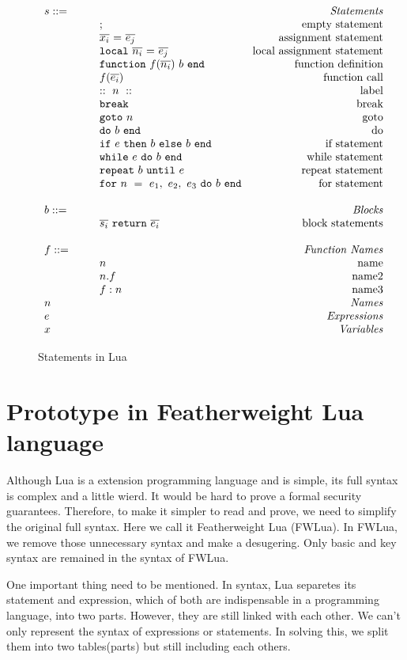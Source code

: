 \documentclass{article}
\begin{document}
\begin{figure}
\caption{Statements in Lua}
\label{fig:LuaStat}
\[
\begin{array}{llr}
  \mydefhead{s ::=\qquad\qquad\qquad\qquad}{Statements}
  \mydefcase{;}{empty statement}
  \mydefcase{\assign x e}{assignment statement}
  \mydefcase{\local n e}{local assignment statement}
  \mydefcase{\function f n b}{function definition}
  \mydefcase{f(\overline{e_i})}{function call}
  \mydefcase{::~n~::}{label}
  \mydefcase{\tt break}{break}
  \mydefcase{{\tt goto} ~n}{goto}
  \mydefcase{\doe b}{do}
  \mydefcase{\ife e b b}{if statement}
  \mydefcase{\whilee e b}{while statement}
  \mydefcase{\repeate e b}{repeat statement}
  \mydefcase{\for n e b}{for statement}
  \\
  \mydefhead{b ::=\qquad\qquad\qquad\qquad}{Blocks}
  \mydefcase{\overline{s_i}~{\tt return}~\overline{e_i}}{block statements}
  \\
  \mydefhead{f ::=\qquad\qquad\qquad\qquad}{Function Names}
  \mydefcase{n}{name}
  \mydefcase{n.f}{name2}
  \mydefcase{f:n}{name3}
  \mydefhead{n \qquad\qquad\qquad\qquad}{Names}
  \mydefhead{e \qquad\qquad\qquad\qquad}{Expressions}
  \mydefhead{x \qquad\qquad\qquad\qquad}{Variables}
\end{array}
\]
\end{figure}



\section{Prototype in Featherweight Lua language}
Although Lua is a extension programming language and is simple, its full syntax is complex and a little wierd. It would be hard to prove a formal security guarantees. Therefore, to make it simpler to read and prove, we need to simplify the original full syntax. Here we call it Featherweight Lua (FWLua). In FWLua, we remove those unnecessary syntax and make a desugering. Only basic and key syntax are remained in the syntax of FWLua.  

One important thing need to be mentioned. In syntax, Lua separetes its statement and expression, which of both are indispensable in a programming language, into two parts. However, they are still linked with each other. We can't only represent the syntax of expressions or statements. In solving this, we split them into two tables(parts) but still including each others. 
\end{document}
